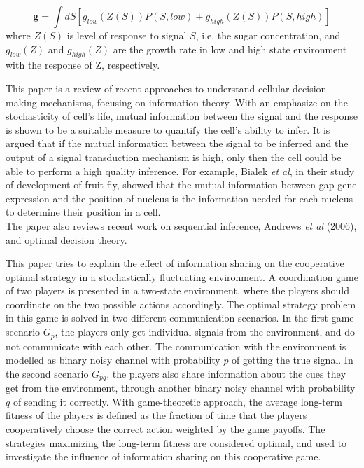 \begin{equation}
\overline{\mathbf{g}}=\int d S\left[g_{low}(Z(S)) P(S, { low })+g_{ {high }}(Z(S)) P(S,{ high })\right]
\end{equation}
where $ Z(S) $ is level of response to signal $ S $, i.e. the sugar concentration, and $ g_{low}(Z) $ and $ g_{high}(Z) $ are the growth rate in low and high state environment with the response of Z, respectively. 

This paper is a review of recent approaches to understand cellular decision-making mechanisms, focusing on information theory. With an emphasize on the stochasticity of cell's life, mutual information between the signal and the response is shown to be a suitable measure to quantify the cell's ability to infer. It is argued that if the mutual information between the signal to be inferred and the output of a signal transduction mechanism is high, only then the cell could be able to perform a high quality inference. For example, Bialek \textit{et al}, in their study of development of fruit fly, showed that the mutual information between gap gene expression and the position of nucleus is the information needed for each nucleus to determine their position in a cell. \\
The paper also reviews recent work on sequential inference, Andrews \textit{et al} (2006), and optimal decision theory.

This paper tries to explain the effect of information sharing on the cooperative optimal strategy in a stochastically fluctuating environment. A coordination game of two players is presented in a two-state environment, where the players should coordinate on the two possible actions accordingly. The optimal strategy problem in this game is solved in two different communication scenarios. In the first game scenario $ G_{p} $, the players only get individual signals from the environment, and do not communicate with each other. The communication with the environment is modelled as binary noisy channel with probability $ p $ of getting the true signal. In the second scenario $ G_{pq} $, the players also share information about the cues they get from the environment, through another binary noisy channel with probability $ q $ of sending it correctly. With game-theoretic approach, the average long-term fitness of the players is defined as the fraction of time that the players cooperatively choose the correct action weighted by the game payoffs. The strategies maximizing the long-term fitness are considered optimal, and used to investigate the influence of information sharing on this cooperative game.



